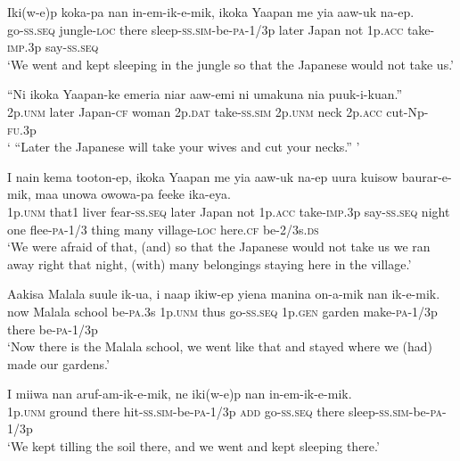 \ea\label{ex:a:x17}
\gll  Iki(w-e)p  koka-pa  nan  in-em-ik-e-mik,       ikoka  Yaapan  me  yia  aaw-uk  na-ep. \\
go-\textsc{ss.seq}  jungle-\textsc{loc}  there  sleep-\textsc{ss}.\textsc{sim}-be-\textsc{pa}-1/3p later  Japan  not  1p.\textsc{acc}  take-\textsc{imp}.3p  say-\textsc{ss.seq} \\
\glt ‘We went and kept sleeping in the jungle so that the Japanese would not take us.’ \\
\z


\ea\label{ex:a:x18}
\gll  “Ni  ikoka  Yaapan-ke  emeria  niar  aaw-emi   ni  umakuna  nia  puuk-i-kuan.” \\
2p.\textsc{unm}  later  Japan-\textsc{cf}  woman  2p.\textsc{dat}  take-\textsc{ss}.\textsc{sim} 2p.\textsc{unm}  neck  2p.\textsc{acc}  cut-Np-\textsc{fu}.3p \\
\glt ‘ “Later the Japanese will take your wives and cut your necks.” ’ \\
\z


\ea\label{ex:a:x19}
\gll  I  nain  kema  tooton-ep,  ikoka  Yaapan  me  yia       aaw-uk  na-ep  uura  kuisow  baurar-e-mik, maa  unowa  owowa-pa  feeke  ika-eya. \\
1p.\textsc{unm}  that1  liver  fear-\textsc{ss.seq}  later  Japan  not  1p.\textsc{acc} take-\textsc{imp}.3p  say-\textsc{ss.seq}  night  one  flee-\textsc{pa}-1/3 thing  many  village-\textsc{loc}  here.\textsc{cf}  be-2/3s.\textsc{ds}\\
\glt ‘We were afraid of that, (and) so that the Japanese would not take us we ran away right that night, (with) many belongings staying here in the village.’ \\
\z


\ea\label{ex:a:x20}
\gll  Aakisa  Malala  suule  ik-ua,  i  naap  ikiw-ep yiena  manina  on-a-mik  nan  ik-e-mik. \\
now  Malala  school  be-\textsc{pa}.3s  1p.\textsc{unm}  thus  go-\textsc{ss.seq} 1p.\textsc{gen}  garden  make-\textsc{pa}-1/3p  there  be-\textsc{pa}-1/3p \\
\glt ‘Now there is the Malala school, we went like that and stayed where we (had) made our gardens.’ \\
\z


\ea\label{ex:a:x21}
\gll  I  miiwa  nan  aruf-am-ik-e-mik,  ne  iki(w-e)p  nan  in-em-ik-e-mik. \\
1p.\textsc{unm}  ground  there  hit-\textsc{ss}.\textsc{sim}-be-\textsc{pa}-1/3p  \textsc{add}  go-\textsc{ss.seq} there  sleep-\textsc{ss}.\textsc{sim}-be-\textsc{pa}-1/3p \\
\glt ‘We kept tilling the soil there, and we went and kept sleeping there.’ \\
\z


